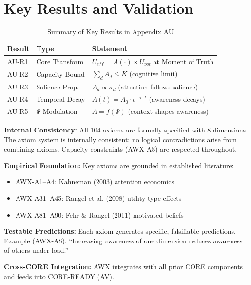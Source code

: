 \section{Key Results and Validation}
\label{sec:au-results}

\begin{table}[htbp]
\centering
\caption{Summary of Key Results in Appendix AU}
\label{tab:au-results}
\renewcommand{\arraystretch}{1.2}
\begin{tabular}{@{}llp{6cm}@{}}
\toprule
\textbf{Result} & \textbf{Type} & \textbf{Statement} \\
\midrule
AU-R1 & Core Transform & $U_{eff} = A(\cdot) \times U_{pot}$ at Moment of Truth \\
AU-R2 & Capacity Bound & $\sum_d A_d \leq K$ (cognitive limit) \\
AU-R3 & Salience Prop. & $A_d \propto \sigma_d$ (attention follows salience) \\
AU-R4 & Temporal Decay & $A(t) = A_0 \cdot e^{-\tau \cdot t}$ (awareness decays) \\
AU-R5 & $\Psi$-Modulation & $A = f(\Psi)$ (context shapes awareness) \\
\bottomrule
\end{tabular}
\end{table}

\begin{tcolorbox}[colback=green!5!white, colframe=green!75!black,
    title=\textbf{Validation Summary}]

\textbf{Internal Consistency:}
All 104 axioms are formally specified with 8 dimensions. The axiom system is
internally consistent: no logical contradictions arise from combining axioms.
Capacity constraints (AWX-A8) are respected throughout.

\textbf{Empirical Foundation:}
Key axioms are grounded in established literature:
\begin{itemize}[nosep]
    \item AWX-A1--A4: Kahneman (2003) attention economics
    \item AWX-A31--A45: Rangel et al. (2008) utility-type effects
    \item AWX-A81--A90: Fehr \& Rangel (2011) motivated beliefs
\end{itemize}

\textbf{Testable Predictions:}
Each axiom generates specific, falsifiable predictions. Example (AWX-A8):
``Increasing awareness of one dimension reduces awareness of others under load.''

\textbf{Cross-CORE Integration:}
AWX integrates with all prior CORE components and feeds into CORE-READY (AV).

\end{tcolorbox}


